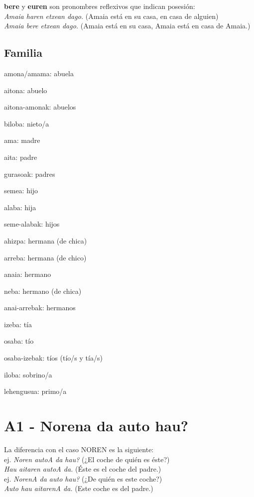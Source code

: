 \documentclass[11pt, a4paper]{article}
\begin{document}
\noindent \textbf{bere} y \textbf{euren} son pronombres reflexivos que indican posesión:\\
\indent \textit{Amaia haren etxean dago.} (Amaia está en su casa, en casa de alguien)\\
\indent \textit{Amaia bere etxean dago.} (Amaia está en su casa, Amaia está en casa de Amaia.)

\subsection{Familia}
\begin{itemize}
\begin{multicols}{2}
\item amona/amama: abuela
\item aitona: abuelo
\item aitona-amonak: abuelos
\item biloba: nieto/a
\item ama: madre
\item aita: padre
\item gurasoak: padres
\item semea: hijo
\item alaba: hija
\item seme-alabak: hijos
\item ahizpa: hermana (de chica)
\item arreba: hermana (de chico)
\item anaia: hermano
\item neba: hermano (de chica)
\item anai-arrebak: hermanos
\item izeba: tía
\item osaba: tío
\item osaba-izebak: tíos (tío/s y tía/s)
\item iloba: sobrino/a
\item lehengusua: primo/a
\end{multicols}
\end{itemize}

\section{A1 - Norena da auto hau?}
\noindent La diferencia con el caso NOREN es la siguiente:\\
\indent ej. \textit{Noren autoA da hau?} (¿El coche de quién es éste?)\\
\indent \textit{Hau aitaren autoA da.} (Éste es el coche del padre.)\\
\indent ej. \textit{NorenA da auto hau?} (¿De quién es este coche?)\\
\indent \textit{Auto hau aitarenA da.} (Este coche es del padre.)\\
\end{document}
